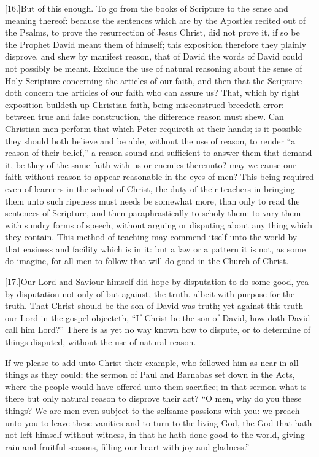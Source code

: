 [16.]But of this enough. To go from the books of Scripture to the sense and meaning thereof: because the sentences which are by the Apostles recited out of the Psalms, to prove the resurrection of Jesus Christ, did not prove it, if so be the Prophet David meant them of himself; this exposition therefore they plainly disprove, and shew by manifest reason, that of David the words of David could not possibly be meant. Exclude the use of natural reasoning about the sense of Holy Scripture concerning the articles of our faith, and then that the Scripture doth concern the articles of our faith who can assure us? That, which by right exposition buildeth up Christian faith, being misconstrued breedeth error: between true and false construction, the difference reason must shew. Can Christian men perform that which Peter requireth at their hands; is it possible they should both believe and be able, without the use of reason, to render “a reason of their belief,” a reason sound and sufficient to answer them that demand it, be they of the same faith with us or enemies thereunto? may we cause our faith without reason to appear reasonable in the eyes of men? This being required even of learners in the school of Christ, the duty of their teachers in bringing them unto such ripeness must needs be somewhat more, than only to read the sentences of Scripture, and then paraphrastically to scholy them: to vary them with sundry forms of speech, without arguing or disputing about any thing which they contain. This method of teaching may  commend itself unto the world by that easiness and facility which is in it: but a law or a pattern it is not, as some do imagine, for all men to follow that will do good in the Church of Christ.

[17.]Our Lord and Saviour himself did hope by disputation to do some good, yea by disputation not only of but against, the truth, albeit with purpose for the truth. That Christ should be the son of David was truth; yet against this truth our Lord in the gospel objecteth, “If Christ be the son of David, how doth David call him Lord?” There is as yet no way known how to dispute, or to determine of things disputed, without the use of natural reason.

If we please to add unto Christ their example, who followed him as near in all things as they could; the sermon of Paul and Barnabas set down in the Acts, where the people would have offered unto them sacrifice; in that sermon what is there but only natural reason to disprove their act? “O men, why do you these things? We are men even subject to the selfsame passions with you: we preach unto you to leave these vanities and to turn to the living God, the God that hath not left himself without witness, in that he hath done good to the world, giving rain and fruitful seasons, filling our heart with joy and gladness.”

